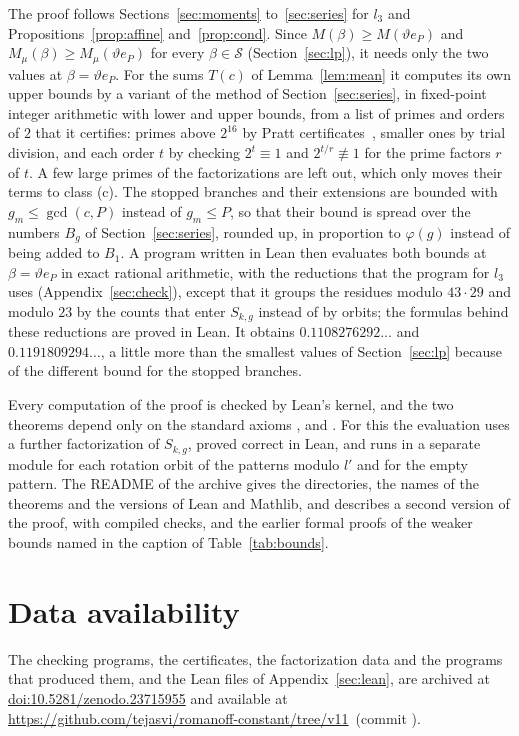 \documentclass[11pt]{amsart}
\theoremstyle{definition}
\theoremstyle{remark}
\numberwithin{equation}{section}
\newcommand{\lean}[1]{\texttt{\detokenize{#1}}}
\newcommand{\ZENODODOI}{10.5281/zenodo.23715955}%
\def\RepoCommit{}
\newcommand{\RepoLink}{\url{https://github.com/tejasvi/romanoff-constant/tree/v11}\ifx\RepoCommit\empty\else\ (commit \texttt{\RepoCommit})\fi}
\begin{document}
The proof follows Sections~\ref{sec:moments} to~\ref{sec:series} for $l_3$ and Propositions~\ref{prop:affine} and~\ref{prop:cond}. Since $M(\beta)\ge M(\vartheta e_P)$ and $M_\mu(\beta)\ge M_\mu(\vartheta e_P)$ for every $\beta\in\mathcal S$ (Section~\ref{sec:lp}), it needs only the two values at $\beta=\vartheta e_P$. For the sums $T(c)$ of Lemma~\ref{lem:mean} it computes its own upper bounds by a variant of the method of Section~\ref{sec:series}, in fixed-point integer arithmetic with lower and upper bounds, from a list of primes and orders of $2$ that it certifies: primes above $2^{16}$ by Pratt certificates~\cite{Pra75}, smaller ones by trial division, and each order $t$ by checking $2^t\equiv1$ and $2^{t/r}\not\equiv1$ for the prime factors $r$ of $t$. A few large primes of the factorizations are left out, which only moves their terms to class (c). The stopped branches and their extensions are bounded with $g_m\le\gcd(c,P)$ instead of $g_m\le P$, so that their bound is spread over the numbers $B_g$ of Section~\ref{sec:series}, rounded up, in proportion to $\varphi(g)$ instead of being added to $B_1$. A program written in Lean then evaluates both bounds at $\beta=\vartheta e_P$ in exact rational arithmetic, with the reductions that the program for $l_3$ uses (Appendix~\ref{sec:check}), except that it groups the residues modulo $43\cdot29$ and modulo $23$ by the counts that enter $S_{k,g}$ instead of by orbits; the formulas behind these reductions are proved in Lean. It obtains $0.1108276292\ldots$ and $0.1191809294\ldots$, a little more than the smallest values of Section~\ref{sec:lp} because of the different bound for the stopped branches.

Every computation of the proof is checked by Lean's kernel, and the two theorems depend only on the standard axioms \lean{propext}, \lean{Classical.choice} and \lean{Quot.sound}. For this the evaluation uses a further factorization of $S_{k,g}$, proved correct in Lean, and runs in a separate module for each rotation orbit of the patterns modulo $l'$ and for the empty pattern. The README of the archive gives the directories, the names of the theorems and the versions of Lean and Mathlib, and describes a second version of the proof, with compiled checks, and the earlier formal proofs of the weaker bounds named in the caption of Table~\ref{tab:bounds}.

\section*{Data availability}
The checking programs, the certificates, the factorization data and the programs that produced them, and the Lean files of Appendix~\ref{sec:lean}, are archived at \href{https://doi.org/\ZENODODOI}{doi:\ZENODODOI} and available at \RepoLink.
\end{document}
